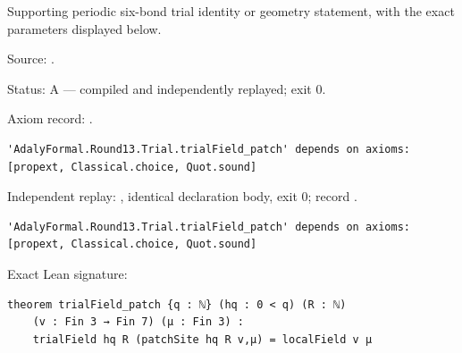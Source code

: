 \begin{theorem}[bp-401]
\label{bp-401}
\leanok
Supporting periodic six-bond trial identity or geometry statement, with the exact parameters displayed below.

\par Source: \texttt{}.
\par Status: A — compiled and independently replayed; exit 0.
\par Axiom record: \texttt{}.
\begin{verbatim}
'AdalyFormal.Round13.Trial.trialField_patch' depends on axioms: [propext, Classical.choice, Quot.sound]
\end{verbatim}
\par Independent replay: \texttt{}, identical declaration body, exit 0; record \texttt{}.
\begin{verbatim}
'AdalyFormal.Round13.Trial.trialField_patch' depends on axioms: [propext, Classical.choice, Quot.sound]
\end{verbatim}
\par Exact Lean signature:
\begin{verbatim}
theorem trialField_patch {q : ℕ} (hq : 0 < q) (R : ℕ)
    (v : Fin 3 → Fin 7) (μ : Fin 3) :
    trialField hq R (patchSite hq R v,μ) = localField v μ
\end{verbatim}
\end{theorem}

